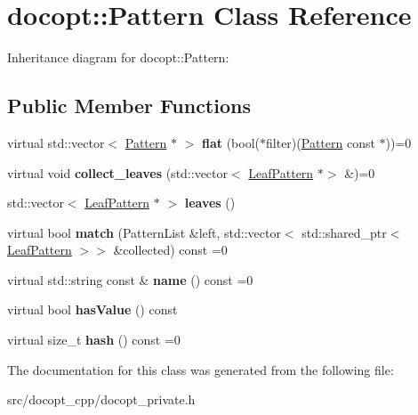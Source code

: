 \hypertarget{classdocopt_1_1Pattern}{}\section{docopt\+:\+:Pattern Class Reference}
\label{classdocopt_1_1Pattern}


Inheritance diagram for docopt\+:\+:Pattern\+:
\subsection*{Public Member Functions}
\begin{DoxyCompactItemize}
\item 
\mbox{\label{classdocopt_1_1Pattern_a0a235229a02694f2127df05a890dec94}} 
virtual std\+::vector$<$ \hyperlink{classdocopt_1_1Pattern}{Pattern} $\ast$ $>$ {\bfseries flat} (bool($\ast$filter)(\hyperlink{classdocopt_1_1Pattern}{Pattern} const $\ast$))=0
\item 
\mbox{\label{classdocopt_1_1Pattern_a6a16e61f7fc1634ff90b23aaf4336e2f}} 
virtual void {\bfseries collect\+\_\+leaves} (std\+::vector$<$ \hyperlink{classdocopt_1_1LeafPattern}{Leaf\+Pattern} $\ast$$>$ \&)=0
\item 
\mbox{\label{classdocopt_1_1Pattern_ae85dc8111e7786da5f19077d803683cb}} 
std\+::vector$<$ \hyperlink{classdocopt_1_1LeafPattern}{Leaf\+Pattern} $\ast$ $>$ {\bfseries leaves} ()
\item 
\mbox{\label{classdocopt_1_1Pattern_abc6c22c0858f5a02be93530dc5e5c340}} 
virtual bool {\bfseries match} (Pattern\+List \&left, std\+::vector$<$ std\+::shared\+\_\+ptr$<$ \hyperlink{classdocopt_1_1LeafPattern}{Leaf\+Pattern} $>$$>$ \&collected) const =0
\item 
\mbox{\label{classdocopt_1_1Pattern_a2334b803066089f752f75dfb8b6e6791}} 
virtual std\+::string const  \& {\bfseries name} () const =0
\item 
\mbox{\label{classdocopt_1_1Pattern_a952fcee01661ea94019fdcbe168005a7}} 
virtual bool {\bfseries has\+Value} () const
\item 
\mbox{\label{classdocopt_1_1Pattern_a4fdb3144b57b5a9350529c42878f1578}} 
virtual size\+\_\+t {\bfseries hash} () const =0
\end{DoxyCompactItemize}


The documentation for this class was generated from the following file\+:\begin{DoxyCompactItemize}
\item 
src/docopt\+\_\+cpp/docopt\+\_\+private.\+h\end{DoxyCompactItemize}
